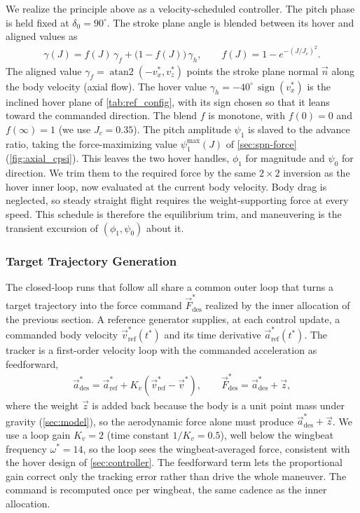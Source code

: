 \documentclass[11pt,letterpaper]{article}
\begin{document}
We realize the principle above as a velocity-scheduled controller. The pitch
phase is held fixed at $\delta_0 = 90^\circ$. The stroke plane angle is blended
between its hover and aligned values as
\begin{align}
    \gamma(J) = f(J)\,\gamma_f + \bigl(1 - f(J)\bigr)\,\gamma_h, \qquad
    f(J) = 1 - e^{-(J/J_c)^2}.
\end{align}
The aligned value $\gamma_f = \operatorname{atan2}(-v_x^*, v_z^*)$ points the
stroke plane normal $\vec{n}$ along the body velocity (axial flow).
The hover value $\gamma_h = -40^\circ\,\operatorname{sign}(v_x^*)$ is the
inclined hover plane of \autoref{tab:ref_config}, with its sign chosen so that
it leans toward the commanded direction. The blend $f$ is monotone, with
$f(0) = 0$ and $f(\infty) = 1$ (we use $J_c = 0.35$). The pitch amplitude
$\psi_1$ is slaved to the advance ratio, taking the force-maximizing value
$\psi_1^{\max}(J)$ of \autoref{sec:spn-force} (\autoref{fig:axial_cpsi}). This
leaves the two hover handles, $\phi_1$ for magnitude and $\psi_0$ for direction.
We trim them to the required force by the same $2\times2$ inversion as the hover
inner loop, now evaluated at the current body velocity. Body drag is neglected,
so steady straight flight requires the weight-supporting force at every speed.
This schedule is therefore the equilibrium trim, and maneuvering is the
transient excursion of $(\phi_1, \psi_0)$ about it.

\subsubsection{Target Trajectory Generation}\label{sec:target-traj}

The closed-loop runs that follow all share a common outer loop that turns a target
trajectory into the force command $\vec{F}_\text{des}^*$ realized by the inner
allocation of the previous section. A reference generator supplies, at each control
update, a commanded body velocity $\vec{v}_\text{ref}^*(t^*)$ and its time derivative
$\vec{a}_\text{ref}^*(t^*)$. The tracker is a first-order velocity loop with the
commanded acceleration as feedforward,
\begin{align*}
    \vec{a}_\text{des}^* = \vec{a}_\text{ref}^* + K_v\left(\vec{v}_\text{ref}^* - \vec{v}^*\right), \qquad
    \vec{F}_\text{des}^* = \vec{a}_\text{des}^* + \vec{z},
\end{align*}
where the weight $\vec{z}$ is added back because the body is a unit point mass under
gravity (\autoref{sec:model}), so the aerodynamic force alone must produce
$\vec{a}_\text{des}^* + \vec{z}$. We use a loop gain $K_v = 2$ (time constant
$1/K_v = 0.5$), well below the wingbeat frequency $\omega^* = 14$, so the loop sees the
wingbeat-averaged force, consistent with the hover design of \autoref{sec:controller}.
The feedforward term lets the proportional gain correct only the tracking error rather
than drive the whole maneuver. The command is recomputed once per wingbeat, the same
cadence as the inner allocation.
\end{document}

